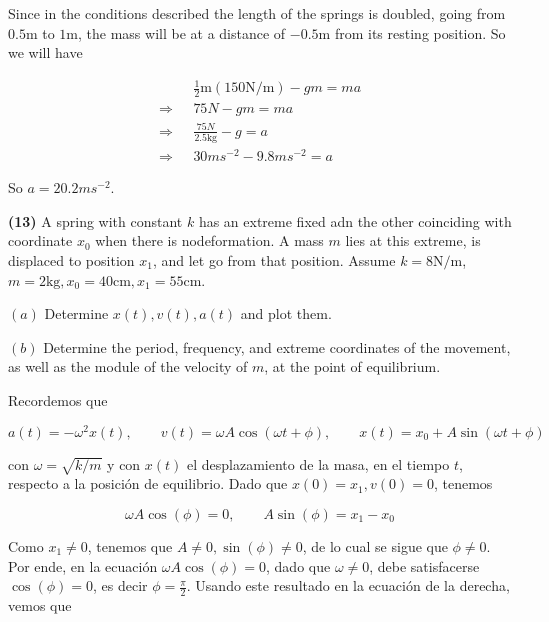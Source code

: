 \documentclass[12pt]{article}
\theoremstyle{definition}
\begin{document}
Since in the conditions described the length of the springs is doubled, going
from $0.5\text{m}$ to $1\text{m}$, the mass will be at a distance of
$-0.5\text{m}$ from its resting position. So we will have 

\begin{align*}
    &\frac{1}{2}\text{m} \left( 150 \text{N/m} \right)  - gm = ma \\ 
    \Rightarrow ~ ~ ~
    &75N - gm = ma \\ 
    \Rightarrow ~ ~ ~ 
    &\frac{75N}{2.5\text{kg}} - g = a \\ 
    \Rightarrow ~ ~~ 
    &30ms^{-2} - 9.8 ms^{-2} = a
\end{align*}

So $a = 20.2 ms^{-2}$.


\pagebreak 

\begin{shaded}
    \textbf{(13)} A spring with constant $k$ has an extreme fixed adn the other
    coinciding with coordinate $x_0$ when there is nodeformation. A mass $m$
    lies at this extreme, is displaced to position $x_1$, and let go from that
    position. Assume $k = 8 \text{N/m}$, $m = 2\text{kg}, x_0 = 40\text{cm}, x_1
    = 55\text{cm}$. 

    $(a)$ Determine $x(t), v(t), a(t)$ and plot them. 

    $(b)$ Determine the period, frequency, and extreme coordinates of the
    movement, as well as the module of the velocity of $m$, at the point of
    equilibrium.
\end{shaded}

Recordemos que

\begin{equation*}
    a(t) = -\omega^2 x(t), \qquad v(t) = \omega A \cos(\omega t + \phi), \qquad
    x(t) = x_0 + A \sin(\omega t + \phi)
\end{equation*}

con $\omega = \sqrt{k / m}$ y con $x(t)$ el desplazamiento de la masa, en el
tiempo $t$, respecto a la posición de equilibrio. Dado que $x(0) = x_1, v(0) =
0$, tenemos 

\begin{equation*}
    \omega A \cos(\phi) = 0, \qquad A \sin(\phi) = x_1 - x_0
\end{equation*}

Como $x_1 \neq 0$, tenemos que $A \neq 0, \sin(\phi) \neq 0$, de lo cual se
sigue que $\phi \neq 0$. Por ende, en la ecuación $\omega A \cos(\phi) = 0$,
dado que $\omega \neq 0$, debe satisfacerse $\cos(\phi) = 0$, es decir $\phi =
\frac{\pi}{2}$. Usando este resultado en la ecuación de la derecha, vemos que 
\end{document}
